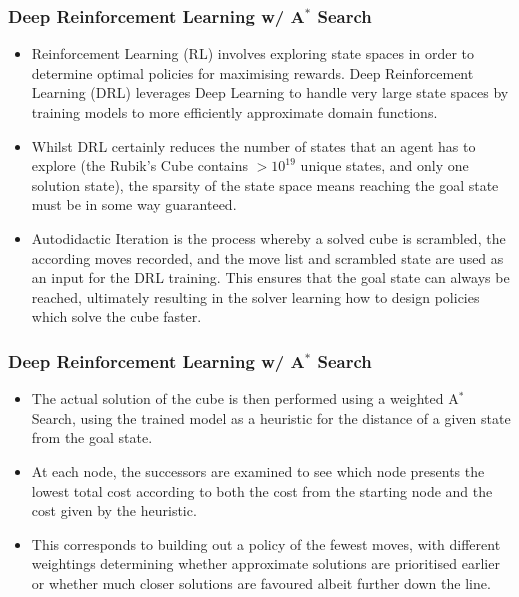 \documentclass[UKenglish]{beamer}
\begin{document}
\begin{frame}
\frametitle{Deep Reinforcement Learning w/ A$^\ast$ Search}
\begin{itemize}
    \item Reinforcement Learning (RL) involves exploring state spaces in order to determine optimal policies for maximising rewards. Deep Reinforcement Learning (DRL) leverages Deep Learning to handle very large state spaces by training models to more efficiently approximate domain functions.
    \item Whilst DRL certainly reduces the number of states that an agent has to explore (the Rubik's Cube contains $ > 10^{19}$ unique states, and only one solution state), the sparsity of the state space means reaching the goal state must be in some way guaranteed.
    \item Autodidactic Iteration is the process whereby a solved cube is scrambled, the according moves recorded, and the move list and scrambled state are used as an input for the DRL training. This ensures that the goal state can always be reached, ultimately resulting in the solver learning how to design policies which solve the cube faster.
\end{itemize}
\end{frame}

\begin{frame}
\frametitle{Deep Reinforcement Learning w/ A$^\ast$ Search}
\begin{itemize}
    \item The actual solution of the cube is then performed using a weighted A$^\ast$ Search, using the trained model as a heuristic for the distance of a given state from the goal state.
    \item At each node, the successors are examined to see which node presents the lowest total cost according to both the cost from the starting node and the cost given by the heuristic.
    \item This corresponds to building out a policy of the fewest moves, with different weightings determining whether approximate solutions are prioritised earlier or whether much closer solutions are favoured albeit further down the line.
\end{itemize}
\end{frame}
\end{document}
